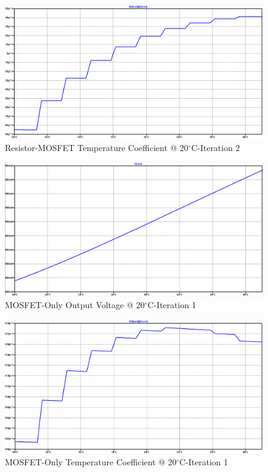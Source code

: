 \documentclass[conference]{IEEEtran}
\begin{document}
\begin{figure}[!htbp]
  	\centering
  	\includegraphics[scale=0.35]{images/appendix/mos-res2-tempco.png}
  	\caption[output-z-meas]{Resistor-MOSFET Temperature Coefficient @ 20$^{\circ}$C-Iteration 2}
  	\label{fig:mos-res2-tempco}
	\end{figure}

\begin{figure}[!htbp]
  	\centering
  	\includegraphics[scale=0.35]{images/appendix/mos-only1-vref.png}
  	\caption[output-z-meas]{MOSFET-Only Output Voltage @ 20$^{\circ}$C-Iteration 1}
  	\label{fig:mos-only1-vref}
	\end{figure}
\begin{figure}[!htbp]
  	\centering
  	\includegraphics[scale=0.35]{images/appendix/mos-only1-tempco.png}
  	\caption[output-z-meas]{MOSFET-Only Temperature Coefficient @ 20$^{\circ}$C-Iteration 1}
  	\label{fig:mos-only1-tempco}
	\end{figure}
\end{document}
